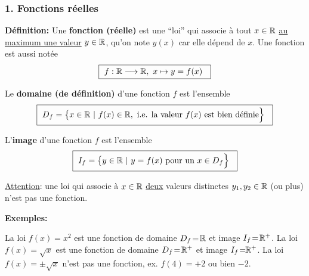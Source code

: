 \begin{frame}
\frametitle{\bf 1. Fonctions r\'eelles}
\medskip 

{\bf D\'efinition:} 
Une {\bf fonction (r\'eelle)} est une ``loi'' qui associe 
\`a tout $x\in\mathbb R$ \underline{au maximum une valeur} $y\in\mathbb R$, 
qu'on note $y(x)$ car elle d\'epend de $x$. Une fonction est aussi not\'ee 
$$\mbox{\framebox{\ 
$f:\R\longrightarrow \R,\ x\mapsto y=f(x)$
\ }} $$
\vspace*{-5mm}

\pause
\begin{itemize}
\bitem
Le {\bf domaine (de d\'efinition)} d'une fonction $f$ est l'ensemble 
\vspace*{-1mm}
$$\mbox{\framebox{\ 
$D_f=\big\{ x\in\R\ |\ f(x)\in\R,\ 
\mbox{i.e. la valeur $f(x)$ est bien d\'efinie}\Big\}$
\ }} $$
\vspace*{-3mm}

\bitem
L'{\bf image} d'une fonction $f$ est l'ensemble 
\vspace*{-1mm}
$$\mbox{\framebox{\ 
$I_f=\big\{ y\in\R\ |\ y=f(x)\ \mbox{pour un $x\in D_f$} \Big\}$
\ }} $$
\end{itemize}
\vspace*{1mm}

\pause
\underline{Attention}: une loi qui associe \`a $x\in\mathbb R$ 
\underline{deux} valeurs distinctes $y_1,y_2\in\mathbb R$ (ou plus) 
n'est pas une fonction.  
\vspace*{2mm}

\pause
{\small 
{\bf Exemples:}
\begin{itemize}
\bitem
La loi $f(x)=x^2$ est une fonction de domaine $D_f\!=\!\mathbb R$ et image $I_f\!=\!\mathbb R^+$.
\bitem
La loi $f(x)=\sqrt{x}$ est une fonction de domaine $D_f\!=\!\mathbb R^+$ et image $I_f\!=\!\!\mathbb R^+$.
\bitem
La loi $f(x)=\pm\sqrt{x}$ n'est pas une fonction, ex. $f(4)=+2$ ou bien $-2$. 
\end{itemize}
}

\end{frame}


